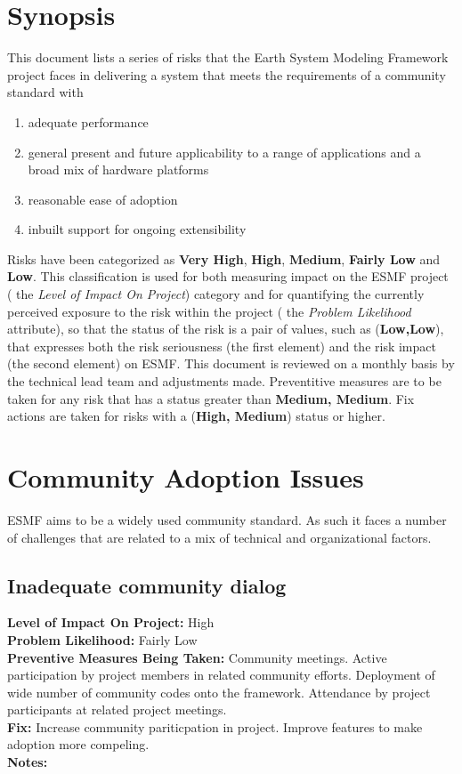 \documentclass[english]{article}
\newcommand{\req}[1]{\section{\hspace{.2in}#1}}
\newcommand{\sreq}[1]{\subsection{\hspace{.2in}#1}}
\newenvironment
{reqlist}
{\begin{list} {} {} \rm \item[]}
{\end{list}}
\begin{document}




\newpage
\tableofcontents

\newpage
\section{Synopsis}

This document lists a series of risks that the Earth System Modeling Framework project faces
in delivering a system that meets the requirements of a community standard with

\begin{enumerate}
\item adequate performance
\item general present and future applicability to a range of applications and a broad mix of hardware platforms
\item reasonable ease of adoption
\item inbuilt support for ongoing extensibility
\end{enumerate}

Risks have been categorized as {\bf Very High}, {\bf High}, {\bf Medium}, {\bf Fairly Low} and {\bf Low}.
This classification is used for both measuring impact on the ESMF project ( the {\it Level of Impact On Project})
category and for quantifying the currently perceived exposure to the risk within
the project ( the {\it Problem Likelihood} attribute), so that the
status of the risk is a pair of values, such as ({\bf Low,Low}), that expresses
both the risk seriousness (the first element) and the risk impact (the second element) on
ESMF.  This document is reviewed on a monthly basis by the technical lead team and adjustments
made. Preventitive measures are to be taken for any risk that has a status greater than {\bf Medium, Medium}.
Fix actions are taken for risks with a ({\bf High, Medium}) status or higher.

\req{Community Adoption Issues}
ESMF aims to be a widely used community standard. As such it faces a number of challenges that are
related to a mix of technical and organizational factors.
\sreq{Inadequate community dialog}
\begin{reqlist}
{\bf Level of Impact On Project:}  High \\
{\bf Problem Likelihood:} Fairly Low\\
{\bf Preventive Measures Being Taken:} Community meetings. Active participation by project
members in related community efforts. Deployment of wide number of community codes
onto the framework. Attendance by project participants at related project
meetings.\\
{\bf Fix:} Increase community pariticpation in project. Improve features to make
adoption more compeling.\\
{\bf Notes:} \\
\end{reqlist}
\end{document}
